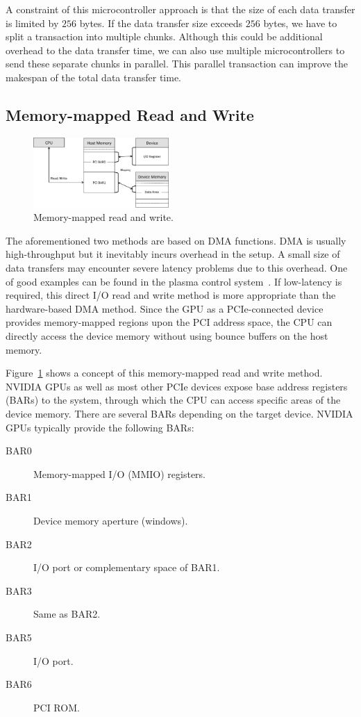 A constraint of this microcontroller approach is that the size of each
data transfer is limited by $256$ bytes.
If the data transfer size exceeds $256$ bytes, we have to split a
transaction into multiple chunks.
Although this could be additional overhead to the data transfer time, we
can also use multiple microcontrollers to send these separate chunks in
parallel.
This parallel transaction can improve the makespan of the total data
transfer time.

\subsection{Memory-mapped Read and Write}
\label{sec:iorw}

\begin{figure}[!t]
 \centering
 \includegraphics[width=0.46\textwidth]{figure/Method/IORW_Method.pdf}
 \caption{Memory-mapped read and write.}
 \label{fig:iorw}
\end{figure}

The aforementioned two methods are based on DMA functions.
DMA is usually high-throughput but it inevitably incurs overhead in the
setup.
A small size of data transfers may encounter severe latency problems due
to this overhead.
One of good examples can be found in the plasma control
system~\cite{Kato_ICCPS13}.
If low-latency is required, this direct I/O read and write method is
more appropriate than the hardware-based DMA method.
Since the GPU as a PCIe-connected device provides memory-mapped regions
upon the PCI address space, the CPU can directly access the device
memory without using bounce buffers on the host memory.

Figure~\ref{fig:iorw} shows a concept of this memory-mapped read and
write method.
NVIDIA GPUs as well as most other PCIe devices expose base address
registers (BARs) to the system, through which the CPU can access
specific areas of the device memory.
There are several BARs depending on the target device.
NVIDIA GPUs typically provide the following BARs:
\begin{description}
 \item[BAR0] Memory-mapped I/O (MMIO) registers.
 \item[BAR1] Device memory aperture (windows).
 \item[BAR2] I/O port or complementary space of BAR1.
 \item[BAR3] Same as BAR2.
 \item[BAR5] I/O port.
 \item[BAR6] PCI ROM.
\end{description}

